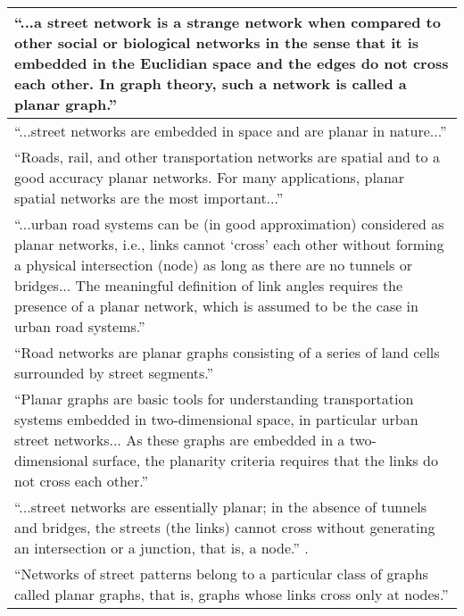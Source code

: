 \begin{tabular}{ | p{\textwidth} | }
\enquote{...a street network is a strange network when compared to other social or biological networks in the sense that it is embedded in the Euclidian space and the edges do not cross each other. In graph theory, such a network is called a planar graph.} \citep[p.~259]{masucci_random_2009} \\ \hline

\enquote{...street networks are embedded in space and are planar in nature...} \citep[p.~114]{porta_networks_2010} \\ \hline

\enquote{Roads, rail, and other transportation networks are spatial and to a good accuracy planar networks. For many applications, planar spatial networks are the most important...} \citep[p.~3]{barthelemy_spatial_2011} \\ \hline

\enquote{...urban road systems can be (in good approximation) considered as planar networks, i.e., links cannot \enquote{cross} each other without forming a physical intersection (node) as long as there are no tunnels or bridges... The meaningful definition of link angles requires the presence of a planar network, which is assumed to be the case in urban road systems.} \citep[pp.~563~\&~567]{chan_urban_2011} \\ \hline

\enquote{Road networks are planar graphs consisting of a series of land cells surrounded by street segments.} \citep[p.~3]{strano_elementary_2012} \\ \hline

\enquote{Planar graphs are basic tools for understanding transportation systems embedded in two-dimensional space, in particular urban street networks... As these graphs are embedded in a two-dimensional surface, the
planarity criteria requires that the links do not cross each other.} \citep[p.~1]{masucci_limited_2013} \\ \hline

\enquote{...street networks are essentially planar; in the absence of tunnels and bridges, the streets (the links) cannot cross without generating an intersection or a junction, that is, a node.} \citep[p.~1]{gudmundsson_entropy_2013}. \\ \hline

\enquote{Networks of street patterns belong to a particular class of graphs called planar graphs, that is, graphs whose links cross only at nodes.} \citep[p.~1074]{strano_urban_2013} \\ \hline


\end{tabular}
